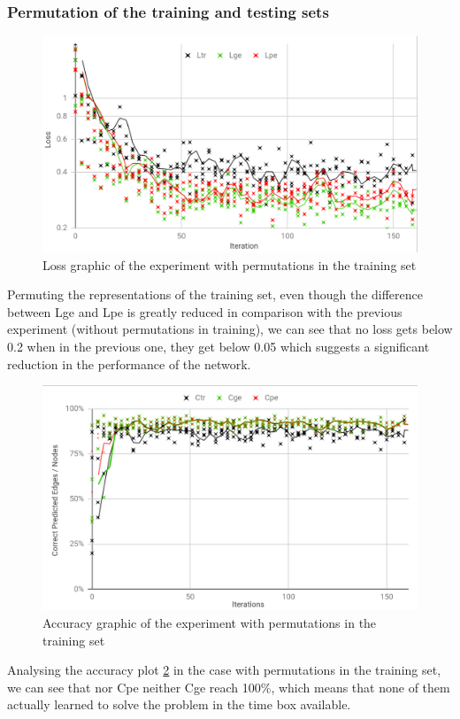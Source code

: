 \subsubsection {Permutation of the training and testing sets}

\begin{figure}[H]
    \centering
    \includegraphics[width=.9\linewidth]
    {fig/content/results/shapes/permuted_training/loss.png}
    \caption{Loss graphic of the experiment with permutations in the training set}
    \label{fig:regions_separation_permuting_training_loss}
\end{figure}

Permuting the representations of the training set, even though the difference between Lge and Lpe is greatly reduced in comparison with the previous experiment (without permutations in training), we can see that no loss gets below 0.2 when in the previous one, they get below 0.05 which suggests a significant reduction in the performance of the network.

\begin{figure}[H]
    \centering
    \includegraphics[width=.9\linewidth]
    {fig/content/results/shapes/permuted_training/correct.png}
    \caption{Accuracy graphic of the experiment with permutations in the training set}
    \label{fig:regions_separation_permuting_training_accuracy}
\end{figure}

Analysing the accuracy plot \ref{fig:regions_separation_permuting_training_accuracy} in the case with permutations in the training set, we can see that nor Cpe neither Cge reach 100\%, which means that none of them actually learned to solve the problem in the time box available. 



